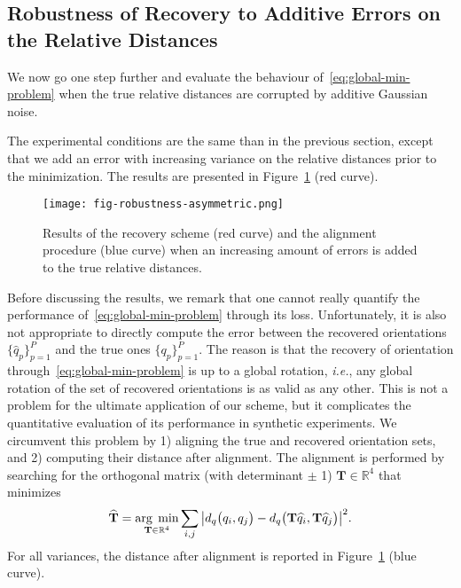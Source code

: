 \subsection{Robustness of Recovery to Additive Errors on the Relative Distances}
\label{subsec:5-6-4-robustness-to-errors}

We now go one step further and evaluate the behaviour of~\eqref{eq:global-min-problem} when the true relative distances are corrupted by  additive Gaussian noise.

The experimental conditions are the same than in the previous section, except that we add an error with increasing variance on the relative distances prior to the minimization. The results are presented in Figure~\ref{fig:recovery-noise-distances} (red curve).

\begin{figure}
    \centering
    \texttt{[image: fig-robustness-asymmetric.png]}
    \caption{Results of the recovery scheme (red curve) and the alignment procedure (blue curve) when an increasing amount of errors is added to the true relative distances.}
    \label{fig:recovery-noise-distances}
\end{figure}

Before discussing the results, we remark that one cannot really quantify the performance of~\eqref{eq:global-min-problem} through its loss. Unfortunately, it is also not appropriate to directly compute the error between the recovered orientations $\big\{\widehat{q}_p\big\}_{p=1}^P$ and the true ones $\big\{q_p\big\}_{p=1}^P$. The reason is that the recovery of orientation through~\eqref{eq:global-min-problem} is up to a global rotation, \textit{i.e.}, any global rotation of the set of recovered orientations is as valid as any other. This is not a problem for the ultimate application of our scheme, but it complicates the quantitative evaluation of its performance in synthetic experiments. We circumvent this problem by 1) aligning the true and recovered orientation sets, and 2) computing their distance after alignment. The alignment is performed by searching for the orthogonal matrix (with determinant $\pm$ 1) $\mathbf{T}\in\mathbb{R}^4$  that minimizes
\begin{equation}
    \label{eq:alignement}
    \widehat{\mathbf{T}}=\underset{\mathbf{T}\in\mathbb{R}^4}{\arg\;\min}\sum_{i,j} \big|d_q\big(q_i,q_j\big)- d_q\big(\mathbf{T}\widehat{q}_i,\mathbf{T}\widehat{q}_j\big)\big|^2.
\end{equation}
For all variances, the distance after alignment is reported in Figure~\ref{fig:recovery-noise-distances} (blue curve).

